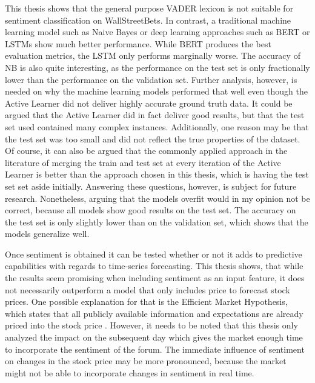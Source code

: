 \documentclass[11pt, a4paper]{article}
\begin{document}
This thesis shows that the general purpose VADER lexicon is not suitable for sentiment classification on WallStreetBets.
In contrast, a traditional machine learning model such as Naive Bayes or deep learning approaches such as BERT or LSTMs
show much better performance. While BERT produces the best evaluation metrics, the LSTM only performs marginally worse.
The accuracy of NB is also quite interesting, as the performance on the test set is only fractionally lower than the performance
on the validation set.
Further analysis, however, is needed on why the machine learning models performed that well even 
though the Active Learner did not deliver highly accurate ground truth data. 
It could be argued that the Active Learner did in fact deliver good results, but that the test set used contained many
complex instances.
Additionally, one reason may be that the test set was too small and did not reflect the true properties of the dataset.
Of course, it can also be argued that the commonly applied approach in the literature of merging the train and test set at 
every iteration of the Active Learner is better than the approach chosen in this thesis, which is having the test set set aside initially.
Answering these questions, however, is subject for future research.
Nonetheless, arguing that the models overfit would in my opinion not be correct, because all models show good results on the test set.
The accuracy on the test set is only slightly lower than on the validation set, which shows that the models generalize well.


Once sentiment is obtained it can be tested whether or not it adds to predictive capabilities with regards to time-series forecasting.
This thesis shows, that while the results seem promising when including sentiment as an input feature, it does not necessarily outperform a
model that only includes price to forecast stock prices. One possible explanation for that is the Efficient Market Hypothesis, which states
that all publicly available information and expectations are already priced into the stock price \citep{fama1970emh}.
However, it needs to be noted that this thesis only analyzed the impact on the subsequent day which gives the market enough time to incorporate
the sentiment of the forum. The immediate influence of sentiment on changes in the stock price may be more pronounced, because the market might
not be able to incorporate changes in sentiment in real time.


\newpage
\end{document}
